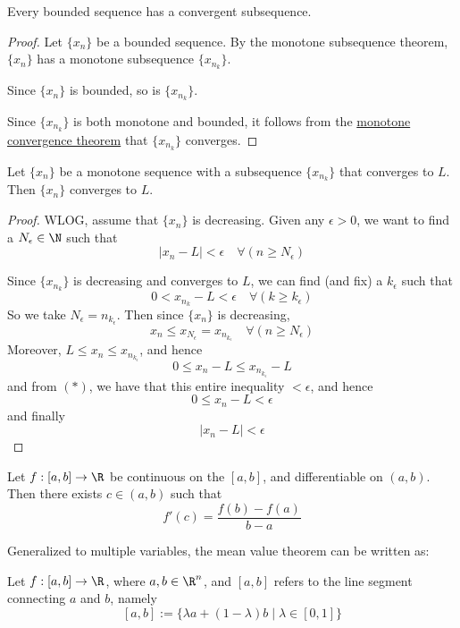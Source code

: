 
Every bounded sequence has a convergent subsequence.

\begin{proof}
	\def\xn{\{x_n\}}
	\def\xnk{\{x_{n_k}\}}

	Let $\xn$ be a bounded sequence. By the monotone subsequence
	theorem, $\xn$ has a monotone subsequence $\xnk$.

	Since $\xn$ is bounded, so is $\xnk$.

	Since $\xnk$ is both monotone and bounded, it follows from the
	\hyperref[ca25eb7]{monotone convergence theorem} that $\xnk$
	converges.
\end{proof}


\label{aaf3ba6}

Let $\{x_n\}$ be a monotone sequence with a subsequence $\{x_{n_k}\}$
that converges to $L$. Then $\{x_n\}$ converges to $L$.

\begin{proof}
	WLOG, assume that $\{x_n\}$ is decreasing.
	Given any $\epsilon>0$, we want to find a $N_\epsilon\in\N$ such that
	$$
		|x_n-L|<\epsilon\quad\forall(n\geq N_\epsilon)
	$$

	Since $\{x_{n_k}\}$ is decreasing and converges to $L$, we can find
	(and fix) a $k_\epsilon$ such that
	\begin{equation*}
		0<x_{n_k}-L<\epsilon\quad\forall(k\geq k_\epsilon)\tag*{($*$)}
	\end{equation*}
	So we take $N_\epsilon=n_{k_\epsilon}$. Then since $\{x_n\}$ is
	decreasing,
	$$
		x_n\leq x_{N_\epsilon}=x_{n_{k_\epsilon}}\quad\forall(n\geq N_\epsilon)
	$$
	Moreover, $L\leq x_n\leq x_{n_{k_\epsilon}}$, and hence
	$$0\leq x_n-L\leq x_{n_{k_\epsilon}}-L$$
	and from $(*)$, we have that this entire inequality $<\epsilon$, and hence
	$$0\leq x_n-L<\epsilon$$
	and finally
	$$|x_n-L|<\epsilon$$
\end{proof}

\label{d37aa2b}

Let $f:[a,b]\to\R$ be continuous on the $[a,b]$, and differentiable on
$(a,b)$. Then there exists $c\in(a,b)$ such that
$$
	f'(c)=\frac{f(b)-f(a)}{b-a}
$$

Generalized to multiple variables, the mean value theorem can be
written as:

Let $f:[a,b]\to\R$, where $a,b\in\R^n$, and $[a,b]$ refers to the line
segment connecting $a$ and $b$, namely
$$
	[a,b]:=\{\lambda a+(1-\lambda)b\mid\lambda\in[0,1]\}
$$

